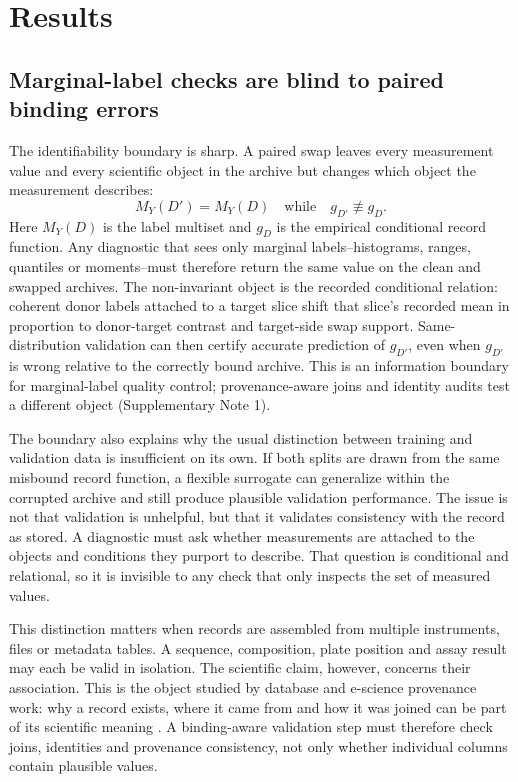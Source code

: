 \section*{Results}

\subsection*{Marginal-label checks are blind to paired binding errors}
The identifiability boundary is sharp. A paired swap leaves every measurement value and every scientific object in the archive but changes which object the measurement describes:
\[
M_Y(D')=M_Y(D)\quad\mathrm{while}\quad g_{D'}\not\equiv g_D .
\]
Here \(M_Y(D)\) is the label multiset and \(g_D\) is the empirical conditional record function. Any diagnostic that sees only marginal labels--histograms, ranges, quantiles or moments--must therefore return the same value on the clean and swapped archives. The non-invariant object is the recorded conditional relation: coherent donor labels attached to a target slice shift that slice's recorded mean in proportion to donor-target contrast and target-side swap support. Same-distribution validation can then certify accurate prediction of \(g_{D'}\), even when \(g_{D'}\) is wrong relative to the correctly bound archive. This is an information boundary for marginal-label quality control; provenance-aware joins and identity audits test a different object (Supplementary Note 1).

The boundary also explains why the usual distinction between training and validation data is insufficient on its own. If both splits are drawn from the same misbound record function, a flexible surrogate can generalize within the corrupted archive and still produce plausible validation performance. The issue is not that validation is unhelpful, but that it validates consistency with the record as stored. A diagnostic must ask whether measurements are attached to the objects and conditions they purport to describe. That question is conditional and relational, so it is invisible to any check that only inspects the set of measured values.

This distinction matters when records are assembled from multiple instruments, files or metadata tables. A sequence, composition, plate position and assay result may each be valid in isolation. The scientific claim, however, concerns their association. This is the object studied by database and e-science provenance work: why a record exists, where it came from and how it was joined can be part of its scientific meaning \citep{buneman2001why,simmhan2005survey,w3c2013provdm,herschel2017provenance}. A binding-aware validation step must therefore check joins, identities and provenance consistency, not only whether individual columns contain plausible values.

